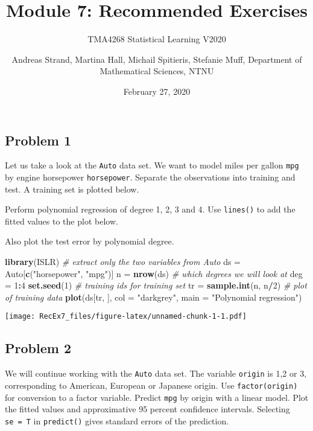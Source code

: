 \documentclass[]{article}
\title{Module 7: Recommended Exercises}
\subtitle{TMA4268 Statistical Learning V2020}
\author{Andreas Strand, Martina Hall, Michail Spitieris, Stefanie Muff,
Department of Mathematical Sciences, NTNU}
\date{February 27, 2020}
\newenvironment{Shaded}{\begin{snugshade}}{\end{snugshade}}
\newcommand{\KeywordTok}[1]{\textcolor[rgb]{0.13,0.29,0.53}{\textbf{#1}}}
\newcommand{\DataTypeTok}[1]{\textcolor[rgb]{0.13,0.29,0.53}{#1}}
\newcommand{\DecValTok}[1]{\textcolor[rgb]{0.00,0.00,0.81}{#1}}
\newcommand{\StringTok}[1]{\textcolor[rgb]{0.31,0.60,0.02}{#1}}
\newcommand{\CommentTok}[1]{\textcolor[rgb]{0.56,0.35,0.01}{\textit{#1}}}
\newcommand{\OperatorTok}[1]{\textcolor[rgb]{0.81,0.36,0.00}{\textbf{#1}}}
\newcommand{\NormalTok}[1]{#1}
\begin{document}
\maketitle

\subsection{Problem 1}\label{problem-1}

Let us take a look at the \texttt{Auto} data set. We want to model miles
per gallon \texttt{mpg} by engine horsepower \texttt{horsepower}.
Separate the observations into training and test. A training set is
plotted below.

Perform polynomial regression of degree 1, 2, 3 and 4. Use
\texttt{lines()} to add the fitted values to the plot below.

Also plot the test error by polynomial degree.

\begin{Shaded}
\begin{Highlighting}[]
\KeywordTok{library}\NormalTok{(ISLR)}
\CommentTok{# extract only the two variables from Auto}
\NormalTok{ds =}\StringTok{ }\NormalTok{Auto[}\KeywordTok{c}\NormalTok{(}\StringTok{"horsepower"}\NormalTok{, }\StringTok{"mpg"}\NormalTok{)]}
\NormalTok{n =}\StringTok{ }\KeywordTok{nrow}\NormalTok{(ds)}
\CommentTok{# which degrees we will look at}
\NormalTok{deg =}\StringTok{ }\DecValTok{1}\OperatorTok{:}\DecValTok{4}
\KeywordTok{set.seed}\NormalTok{(}\DecValTok{1}\NormalTok{)}
\CommentTok{# training ids for training set}
\NormalTok{tr =}\StringTok{ }\KeywordTok{sample.int}\NormalTok{(n, n}\OperatorTok{/}\DecValTok{2}\NormalTok{)}
\CommentTok{# plot of training data}
\KeywordTok{plot}\NormalTok{(ds[tr, ], }\DataTypeTok{col =} \StringTok{"darkgrey"}\NormalTok{, }\DataTypeTok{main =} \StringTok{"Polynomial regression"}\NormalTok{)}
\end{Highlighting}
\end{Shaded}

\texttt{[image: RecEx7\_files/figure-latex/unnamed-chunk-1-1.pdf]}

\subsection{Problem 2}\label{problem-2}

We will continue working with the \texttt{Auto} data set. The variable
\texttt{origin} is 1,2 or 3, corresponding to American, European or
Japanese origin. Use \texttt{factor(origin)} for conversion to a factor
variable. Predict \texttt{mpg} by origin with a linear model. Plot the
fitted values and approximative 95 percent confidence intervals.
Selecting \texttt{se\ =\ T} in \texttt{predict()} gives standard errors
of the prediction.
\end{document}
